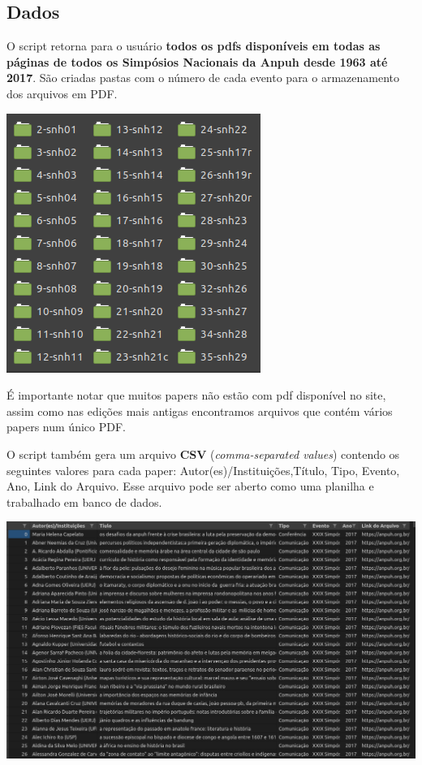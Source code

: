 \documentclass[
]{book}
\begin{document}
\hypertarget{dados}{%
\subsection{Dados}\label{dados}}

O script retorna para o usuário \textbf{todos os pdfs disponíveis em todas as páginas de todos os Simpósios Nacionais da Anpuh desde 1963 até 2017}. São criadas pastas com o número de cada evento para o armazenamento dos arquivos em PDF.

\includegraphics{img/pastas.png}

É importante notar que muitos papers não estão com pdf disponível no site, assim como nas edições mais antigas encontramos arquivos que contém vários papers num único PDF.

O script também gera um arquivo \textbf{CSV} (\emph{comma-separated values}) contendo os seguintes valores para cada paper: Autor(es)/Instituições,Título, Tipo, Evento, Ano, Link do Arquivo. Esse arquivo pode ser aberto como uma planilha e trabalhado em banco de dados.

\includegraphics{img/ex_csv1.png}
\end{document}
